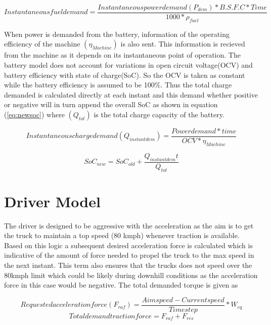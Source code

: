 \documentclass[ExampleMasters.tex]{subfiles}
\begin{document}
\begin{equation} \label{eq:fueldem}
Instantaneous fuel demand=\frac{Instantaneous power demand(P_{dem}) * B.S.F.C * Time}{1000*\rho_{fuel}}
\end{equation}

When power is demanded from the battery, information of the operating efficiency of the machine $(\eta_{Machine})$  is also sent. This information is recieved from the machine as it depends on its instantaneous point of operation. The battery model does not account for variations in open circuit voltage(OCV) and battery efficiency with state of charge(SoC). So the OCV is taken as constant while the battery efficiency is assumed to be 100\%. Thus the total charge demanded is calculated directly at each instant and this demand whether positive or negative will in turn append the overall SoC as shown in equation (\ref{eq:newsoc}) where $(Q_{tot})$ is the total charge capacity of the battery.

\begin{equation} \label{eq:instantchargedem}
Instantaneous charge demand(Q_{instant dem}) =\frac{Power demand * time}{OCV * \eta_{Machine} }
\end{equation}

\begin{equation} \label{eq:newsoc}
SoC_{new} =SoC_{old}+ \frac{Q_{instant dem}t}{Q_{tot}}
\end{equation}

\section{Driver Model}
\label{sec:drivermodel}

The driver is designed to be aggressive with the acceleration as the aim is to get the truck to maintain a top speed (80 kmph) whenever traction is available. Based on this logic a subsequent desired acceleration force is calculated which is indicative of the amount of force needed to propel the truck to the max speed in the next instant. This term also ensures that the trucks does not speed over the 80kmph limit which could be likely during downhill conditions as the acceleration force in this case would be negative. The total demanded torque is given as

\begin{equation} \label{eq:reqacclforce}
Requested acceleration force(F_{raf}) =\frac {Aim speed- Current speed}{Time step}*W_{eq}
\end{equation}
\begin{equation} \label{eq:totdemforce}
Total demand traction force = F_{raf}+F_{res}
\end{equation}
\end{document}
